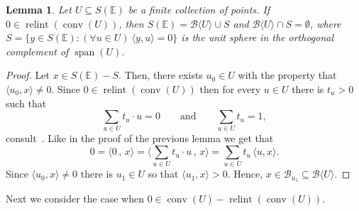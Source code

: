 \documentclass[a4paper,11pt,reqno, english]{amsart}
\newtheorem{lemma}[theorem]{Lemma}
\theoremstyle{definition}
\theoremstyle{remark}
\newcommand\E{\mathbb{E}}
\DeclareMathOperator{\sspan}{\mathrm{span}}
\DeclareMathOperator{\relint}{\mathrm{relint}}
\DeclareMathOperator{\conv}{\mathrm{conv}}
\begin{document}
\medskip
\begin{lemma}
	\label{lem :  case 01}
	Let $U\subseteq S(\E)$ be a finite collection of points.
	If $0\in \relint (\conv (U))$, then $S(\E)=\mathscr{B}\langle U\rangle \cup S$ and $\mathscr{B}\langle U\rangle\cap S=\emptyset$, where
	$
		S=\{y\in S(\E) : (\forall u\in U)\ \langle y,u\rangle=0 \}
	$
	is the unit sphere in the orthogonal complement of $\sspan(U)$.
\end{lemma}
\begin{proof}
	Let $x\in S(\E)-S$.
	Then, there exists $u_0\in U$ with the property that 	$\langle u_0,x\rangle\neq 0$.
	Since $0\in \relint(\conv (U))$ then for every $u\in U$ there is $t_u>0$ such that
	\[
		\sum_{u\in U}t_u\cdot u=0
		\qquad\text{and}\qquad
		\sum_{u\in U}t_u =1,
	\]
	consult~\cite[Thm.\,6]{McMullenShephard}.
	Like in the proof of the previous lemma we get that
	\[
		0=\langle 0\,,\,x\rangle=\big\langle\sum_{u\in U}t_u\cdot u\,,\,x\big\rangle= \sum_{u\in U}t_u\,\langle u,x\rangle .
	\]
	Since $\langle u_0,x\rangle\neq 0$ there is $u_1\in U$ so that  $\langle u_1,x\rangle > 0$.
	Hence, $x\in \mathscr{B}_{u_1}\subseteq \mathscr{B}\langle U\rangle$.
\end{proof}

\medskip
Next we consider the case when $0\in \conv (U) - \relint(\conv (U))$.
\end{document}
